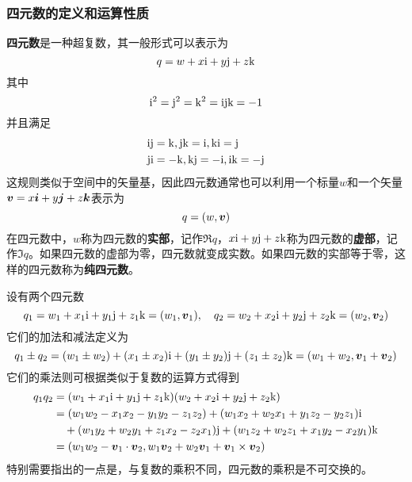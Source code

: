 \subsubsection{四元数的定义和运算性质}

{\bf 四元数}是一种超复数，其一般形式可以表示为
\begin{equation}
	q = w+x\mathrm{i}+y\mathrm{j}+z\mathrm{k}
\end{equation}
其中
\begin{equation*}
	\mathrm{i}^2=\mathrm{j}^2=\mathrm{k}^2=\mathrm{i}\mathrm{j}\mathrm{k}=-1
\end{equation*}
并且满足
\begin{align*}
	& \mathrm{i}\mathrm{j}=\mathrm{k}, \mathrm{j}\mathrm{k}=\mathrm{i},\mathrm{k}\mathrm{i}=\mathrm{j} \\
	& \mathrm{j}\mathrm{i}=-\mathrm{k}, \mathrm{k}\mathrm{j}=-\mathrm{i},\mathrm{i}\mathrm{k}=-\mathrm{j} 
\end{align*}
这规则类似于空间中的矢量基，因此四元数通常也可以利用一个标量$w$和一个矢量$\boldsymbol{v}=x\boldsymbol{i}+y\boldsymbol{j}+z\boldsymbol{k}$表示为
\begin{equation}
	q = (w,\boldsymbol{v})
\end{equation}
在四元数中，$w$称为四元数的{\bf 实部}，记作$\Re q$，$x\mathrm{i}+y\mathrm{j}+z\mathrm{k}$称为四元数的{\bf 虚部}，记作$\Im q$。如果四元数的虚部为零，四元数就变成实数。如果四元数的实部等于零，这样的四元数称为{\bf 纯四元数}。

设有两个四元数
\begin{equation*}
	q_1 = w_1+x_1\mathrm{i}+y_1\mathrm{j}+z_1\mathrm{k} = (w_1,\boldsymbol{v}_1),\quad q_2 = w_2+x_2\mathrm{i}+y_2\mathrm{j}+z_2\mathrm{k} = (w_2,\boldsymbol{v}_2)
\end{equation*}
它们的加法和减法定义为
\begin{equation}
	q_1\pm q_2=(w_1\pm w_2)+(x_1\pm x_2)\mathrm{i}+(y_1\pm y_2)\mathrm{j}+(z_1\pm z_2)\mathrm{k} = (w_1+w_2,\boldsymbol{v}_1+\boldsymbol{v}_2)
\end{equation}
它们的乘法则可根据类似于复数的运算方式得到
\begin{align}
	q_1q_2 & = (w_1+x_1\mathrm{i}+y_1\mathrm{j}+z_1\mathrm{k})(w_2+x_2\mathrm{i}+y_2\mathrm{j}+z_2\mathrm{k}) \nonumber \\
	& = (w_1w_2-x_1x_2-y_1y_2-z_1z_2) + (w_1x_2+w_2x_1+y_1z_2-y_2z_1)\mathrm{i} \nonumber \\
	& \quad {} + (w_1y_2 + w_2y_1 + z_1x_2 - z_2x_1)\mathrm{j} + (w_1z_2 + w_2z_1 + x_1y_2 - x_2y_1)\mathrm{k} \\
	& = (w_1w_2-\boldsymbol{v}_1\cdot\boldsymbol{v}_2,w_1\boldsymbol{v}_2+w_2\boldsymbol{v}_1+\boldsymbol{v}_1\times\boldsymbol{v}_2)
	\label{chapter6:四元数乘法的运算规则}
\end{align}
特别需要指出的一点是，与复数的乘积不同，四元数的乘积是不可交换的。

